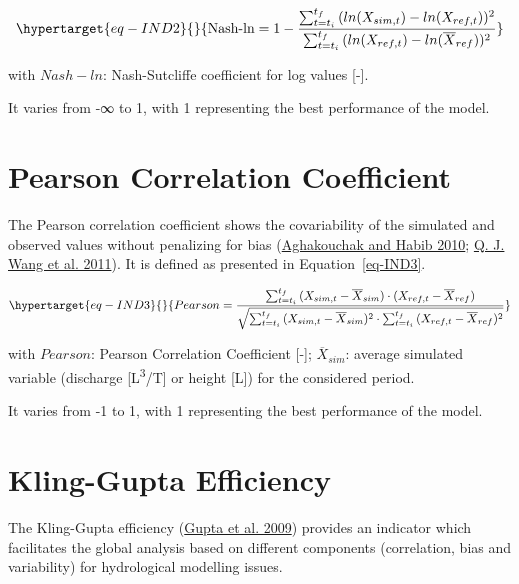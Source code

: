 \documentclass[
  letterpaper,
  DIV=11,
  numbers=noendperiod]{scrreprt}
\begin{document}
\begin{equation}\protect\hypertarget{eq-IND2}{}{
\text{Nash-ln} = 1 - \frac{\sum_{t = t_{i}}^{t_{f}}{(ln(X_{sim,t}) - ln(X_{ref,t}))^{2}}}{\sum_{t = t_{i}}^{t_{f}}{(ln(X_{ref,t}) - ln({\overline{X}_{ref}}))^{2}}}
}\label{eq-IND2}\end{equation}

with \(Nash-ln\): Nash-Sutcliffe coefficient for log values {[}-{]}.

It varies from -∞ to 1, with 1 representing the best performance of the
model.

\hypertarget{sec-tech_performance_indicators_pearson}{%
\chapter{Pearson Correlation
Coefficient}\label{sec-tech_performance_indicators_pearson}}

The Pearson correlation coefficient shows the covariability of the
simulated and observed values without penalizing for bias
(\protect\hyperlink{ref-aghakouchak_application_2010}{Aghakouchak and
Habib 2010}; \protect\hyperlink{ref-wang_monthly_2011}{Q. J. Wang et al.
2011}). It is defined as presented in Equation~\ref{eq-IND3}.

\begin{equation}\protect\hypertarget{eq-IND3}{}{
Pearson = \frac{\sum_{t = t_{i}}^{t_{f}}{(X_{sim,t} - {\overline{X}_{sim}}) \cdot (X_{ref,t} - {\overline{X}_{ref}})}}{\sqrt{\sum_{t = t_{i}}^{t_{f}}{(X_{sim,t} - {\overline{X}_{sim}})^{2}} \cdot \sum_{t = t_{i}}^{t_{f}}{(X_{ref,t} - {\overline{X}_{ref}})^{2}}}}
}\label{eq-IND3}\end{equation}

with \(Pearson\): Pearson Correlation Coefficient {[}-{]};
\({\overline{X}_{sim}}\): average simulated variable (discharge
{[}L\textsuperscript{3}/T{]} or height {[}L{]}) for the considered
period.

It varies from -1 to 1, with 1 representing the best performance of the
model.

\hypertarget{sec-tech_performance_indicators_klinggupta}{%
\chapter{Kling-Gupta
Efficiency}\label{sec-tech_performance_indicators_klinggupta}}

The Kling-Gupta efficiency
(\protect\hyperlink{ref-gupta_decomposition_2009}{Gupta et al. 2009})
provides an indicator which facilitates the global analysis based on
different components (correlation, bias and variability) for
hydrological modelling issues.
\end{document}
